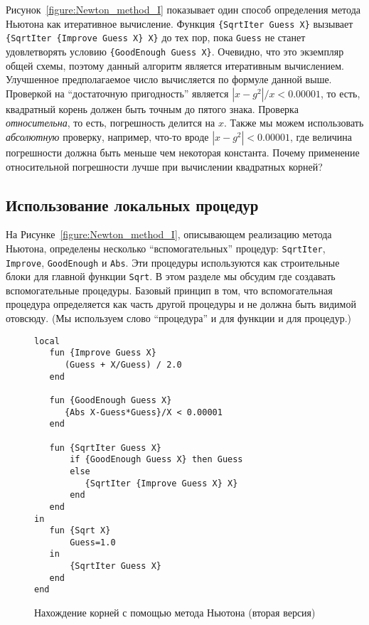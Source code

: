 Рисунок~\ref{figure:Newton_method_I} показывает один способ определения метода Ньютона как итеративное вычисление. Функция \lstinline|{SqrtIter Guess X}| вызывает \lstinline|{SqrtIter {Improve Guess X} X}| до тех пор, пока \lstinline|Guess| не станет удовлетворять условию \lstinline|{GoodEnough Guess X}|. Очевидно, что это экземпляр общей схемы, поэтому данный алгоритм является итеративным вычислением. Улучшенное предполагаемое число вычисляется по формуле данной выше. Проверкой на ``достаточную пригодность'' является $|x - g^2|/x < 0.00001$, то есть, квадратный корень должен быть точным до пятого знака. Проверка \emph{относительна}, то есть, погрешность делится на $x$. Также мы можем использовать \emph{абсолютную} проверку, например, что-то вроде $|x - g^2| < 0.00001$, где величина погрешности должна быть меньше чем некоторая константа. Почему применение относительной погрешности лучше при вычислении квадратных корней?

\subsection{Использование локальных процедур}

На Рисунке~\ref{figure:Newton_method_I}, описывающем реализацию метода Ньютона, определены несколько ``вспомогательных'' процедур: \lstinline!SqrtIter!, \lstinline!Improve!, \lstinline!GoodEnough! и \lstinline!Abs!. Эти процедуры используются как строительные блоки для главной функции \lstinline!Sqrt!. В этом разделе мы обсудим где создавать вспомогательные процедуры. Базовый принцип в том, что вспомогательная процедура определяется как часть другой процедуры и не должна быть видимой отовсюду. (Мы используем слово ``процедура'' и для функции и для процедур.)

\begin{figure}
  \begin{lstlisting}
local
   fun {Improve Guess X}
      (Guess + X/Guess) / 2.0
   end

   fun {GoodEnough Guess X}
      {Abs X-Guess*Guess}/X < 0.00001
   end

   fun {SqrtIter Guess X}
       if {GoodEnough Guess X} then Guess
       else
          {SqrtIter {Improve Guess X} X}
       end
   end
in
   fun {Sqrt X}
       Guess=1.0
   in
       {SqrtIter Guess X}
   end
end
  \end{lstlisting}
  \caption{Нахождение корней с помощью метода Ньютона (вторая версия)}
  \label{figure:Newton_method_II}
\end{figure}

